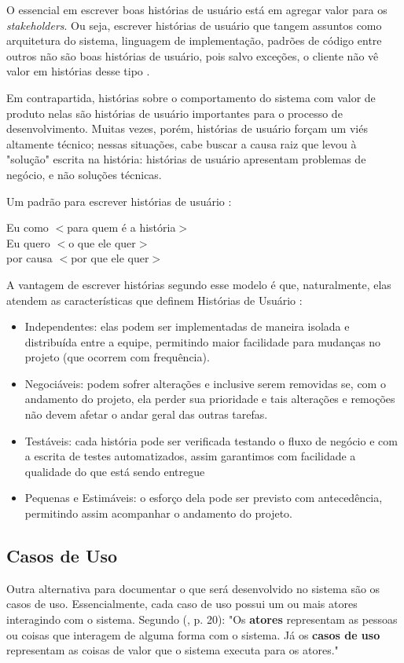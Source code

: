 O essencial em escrever boas histórias de usuário está em agregar valor para os \textit{stakeholders}. Ou seja, escrever histórias de usuário que tangem assuntos como arquitetura do sistema, linguagem de implementação, padrões de código entre outros não são boas histórias de usuário, pois salvo exceções, o cliente não vê valor em histórias desse tipo \cite{jonathanrasmusson}.

Em contrapartida, histórias sobre o comportamento do sistema com valor de produto nelas são histórias de usuário importantes para o processo de desenvolvimento. Muitas vezes, porém, histórias de usuário forçam um viés altamente técnico; nessas situações, cabe buscar a causa raiz que levou à "solução" escrita na história: histórias de usuário apresentam problemas de negócio, e não soluções técnicas.

Um padrão para escrever histórias de usuário \cite[p. ~107]{jonathanrasmusson}:

\begin{citacaoLonga}
Eu como $<$para quem é a história$>$
\\
Eu quero $<$o que ele quer$>$
\\
por causa $<$por que ele quer$>$
\end{citacaoLonga}

A vantagem de escrever histórias segundo esse modelo é que, naturalmente, elas atendem as características que definem Histórias de Usuário \cite{jonathanrasmusson}:

\begin{itemize}
    \item Independentes: elas podem ser implementadas de maneira isolada e distribuída entre a equipe, permitindo maior facilidade para mudanças no projeto (que ocorrem com frequência).
    \item Negociáveis: podem sofrer alterações e inclusive serem removidas se, com o andamento do projeto, ela perder sua prioridade e tais alterações e remoções não devem afetar o andar geral das outras tarefas.
    \item Testáveis: cada história pode ser verificada testando o fluxo de negócio e com a escrita de testes automatizados, assim garantimos com facilidade a qualidade do que está sendo entregue
    \item Pequenas e Estimáveis: o esforço dela pode ser previsto com antecedência, permitindo assim acompanhar o andamento do projeto.
\end{itemize}

\subsection{Casos de Uso}
Outra alternativa para documentar o que será desenvolvido no sistema são os casos de uso. Essencialmente, cada caso de uso possui um ou mais atores interagindo com o sistema. Segundo  (\citeyear{kurtbittnerianspence2002}, p. 20): "Os \textbf{atores} representam as pessoas ou coisas que interagem de alguma forma com o sistema. Já os \textbf{casos de uso} representam as coisas de valor que o sistema executa para os atores."

